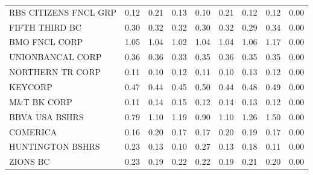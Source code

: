 \documentclass[11pt]{article}
\renewcommand{\baselinestretch}{1.5}
\begin{document}
\begin{table}
\begin{tabular}{|l|c|c|c|c|c|c|c|c|}
RBS CITIZENS FNCL GRP &0.12&0.21&0.13&0.10&0.21&0.12&0.12&0.00\\                                          
FIFTH THIRD BC        &0.30&0.32&0.32&0.30&0.32&0.29&0.34&0.00\\                                          
BMO FNCL CORP         &1.05&1.04&1.02&1.04&1.04&1.06&1.17&0.00\\                                          
UNIONBANCAL CORP      &0.36&0.36&0.33&0.35&0.36&0.35&0.35&0.00\\                                          
NORTHERN TR CORP      &0.11&0.10&0.12&0.11&0.10&0.13&0.12&0.00\\                                          
KEYCORP               &0.47&0.44&0.45&0.50&0.44&0.48&0.49&0.00\\                                          
M\&T BK CORP          &0.11&0.14&0.15&0.12&0.14&0.13&0.12&0.00\\                                          
BBVA USA BSHRS        &0.79&1.10&1.19&0.90&1.10&1.26&1.50&0.00\\                                          
COMERICA              &0.16&0.20&0.17&0.17&0.20&0.19&0.17&0.00\\                                          
HUNTINGTON BSHRS      &0.23&0.13&0.10&0.27&0.13&0.18&0.11&0.00\\                                          
ZIONS BC              &0.23&0.19&0.22&0.22&0.19&0.21&0.20&0.00\\                                          
\hline                                                                                                    
\end{tabular}                                                        
\end{table}


\renewcommand{\baselinestretch}{1.5} \normalsize 
\end{document}
